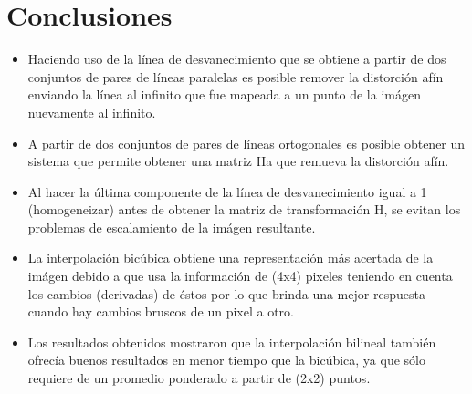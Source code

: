 \documentclass{IEEEtran}
\begin{document}
\section{Conclusiones}
\begin{itemize}

\item Haciendo uso de la línea de desvanecimiento que se obtiene a partir
de dos conjuntos de pares de líneas paralelas es posible remover la distorción
afín enviando la línea al infinito que fue mapeada a un punto de la imágen
nuevamente al infinito.

\item A partir de dos conjuntos de pares de líneas ortogonales es posible
obtener un sistema que permite obtener una matriz Ha que remueva la distorción
afín.

\item Al hacer la última componente de la línea de desvanecimiento igual a 1 
(homogeneizar) antes de obtener la matriz de transformación H, se evitan 
los problemas de escalamiento de la imágen resultante.

\item La interpolación bicúbica obtiene una representación más acertada de
la imágen debido a que usa la información de (4x4) pixeles teniendo en
cuenta los cambios (derivadas) de éstos por lo que brinda una mejor respuesta
cuando hay cambios bruscos de un pixel a otro.

\item Los resultados obtenidos mostraron que la interpolación bilineal
también ofrecía buenos resultados en menor tiempo que la bicúbica, ya que sólo requiere de 
un promedio ponderado a partir de (2x2) puntos.
\end{itemize} 



\end{document}
